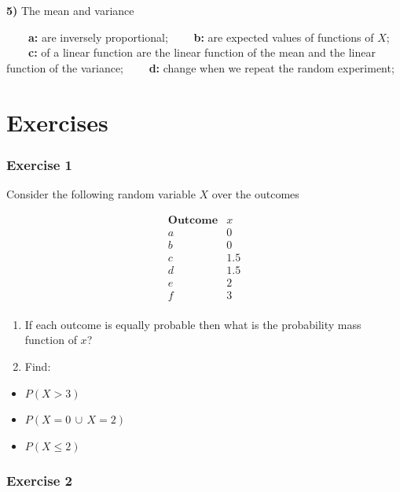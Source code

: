 \documentclass[
]{book}
\providecommand{\tightlist}{%
  \setlength{\itemsep}{0pt}\setlength{\parskip}{0pt}}
\begin{document}
\textbf{5)} The mean and variance

\textbf{\(\qquad\)a:} are inversely proportional; \textbf{\(\qquad\)b:} are expected values of functions of \(X\);
\textbf{\(\qquad\)c:} of a linear function are the linear function of the mean and the linear function of the variance;
\textbf{\(\qquad\)d:} change when we repeat the random experiment;

\hypertarget{exercises-3}{%
\section{Exercises}\label{exercises-3}}

\hypertarget{exercise-1-2}{%
\subsubsection{Exercise 1}\label{exercise-1-2}}

Consider the following random variable \(X\) over the outcomes

\[
\begin{array}{cc}
\textbf{Outcome} & x \\
a & 0 \\
b & 0 \\
c & 1.5 \\
d & 1.5 \\
e & 2 \\
f & 3 \\
\end{array}
\]

\begin{enumerate}
\def\labelenumi{\alph{enumi})}
\item
  If each outcome is equally probable then what is the probability mass function of \(x\)?
\item
  Find:
\end{enumerate}

\begin{itemize}
\tightlist
\item
  \(P(X>3)\)
\item
  \(P(X=0\, \cup \, X=2 )\)
\item
  \(P(X \leq 2)\)
\end{itemize}

\hypertarget{exercise-2-2}{%
\subsubsection{Exercise 2}\label{exercise-2-2}}
\end{document}
